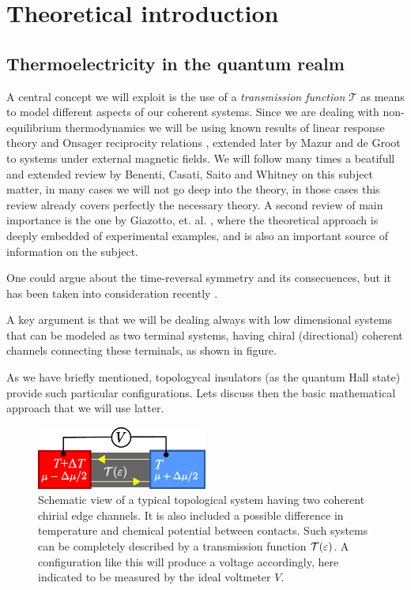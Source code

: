 \chapter{Theoretical introduction}
\label{ch:theory}

\section{Thermoelectricity in the quantum realm}
\label{sec:teo:teoThermoQH}

A central concept we will exploit is the use of a \textit{transmission function} $\mathcal{T}$ as means to model different aspects of our coherent systems. Since we are dealing with non-equilibrium thermodynamics we will be using known results of linear response theory and Onsager reciprocity relations \cite{onsager1931reciprocalI,onsager1931reciprocalII}, extended later by Mazur and de Groot \cite{mazur1953onsager} to systems under external magnetic fields. 
We will follow many times a beatifull and extended review by Benenti, Casati, Saito and Whitney \cite{benenti2017fundamental} on this subject matter, in many cases we will not go deep into the theory, in those cases this review already covers perfectly the necessary theory. A second review of main importance is the one by Giazotto, et. al. \cite{Giazotto2006Mar}, where the theoretical approach is deeply embedded of experimental examples, and is also an important source of information on the subject.

One could argue about the time-reversal symmetry and its consecuences, but it has been taken into consideration recently \cite{luo2020onsager}.

A key argument is that we will be dealing always with low dimensional systems that can be modeled as two terminal systems, having chiral (directional) coherent channels connecting these terminals, as shown in figure. 

As we have briefly mentioned, topologycal insulators (as the quantum Hall state) provide such particular configurations. Lets discuss then the basic mathematical approach that we will use latter.

\begin{figure}
    \centering
    \includegraphics[width = 0.5\textwidth]{figures/theory/2-terminal.pdf}
    \caption{Schematic view of a typical topological system having two coherent chirial edge channels. It is also included a possible difference in temperature and chemical potential between contacts. Such systems can be completely described by a transmission function $\mathcal{T}(\varepsilon)$. A configuration like this will produce a voltage accordingly, here indicated to be measured by the ideal voltmeter $V$.}
    \label{fig:teo:2terminal}
\end{figure}


